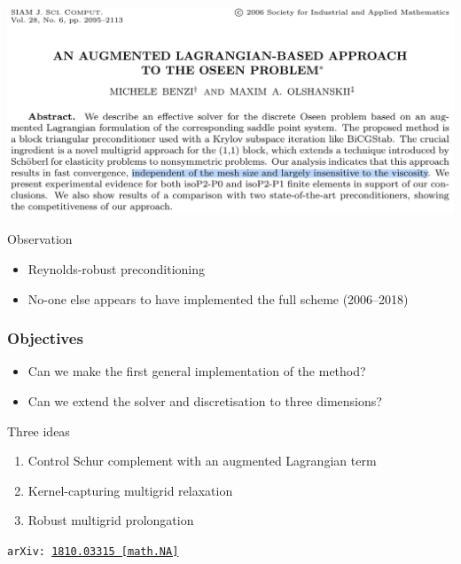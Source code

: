 \documentclass[presentation,aspectratio=43, 10pt]{beamer}
\newcommand{\cmark}{\ding{51}}
\newcommand{\xmark}{\ding{55}}
\newcommand{\arxivlink}[2]{{\texttt{arXiv:\,\href{https://arxiv.org/abs/#1}{#1\,[#2]}}}}
\begin{document}
\begin{frame}
  \begin{center}
    \includegraphics[width=\textwidth]{benzi06}
  \end{center}
  \pause
    \begin{block}{Observation}
    \begin{itemize}
    \item[\cmark] Reynolds-robust preconditioning
    \item[\xmark] No-one else appears to have implemented the full scheme
      (2006--2018)
    \end{itemize}
  \end{block}
\end{frame}

\begin{frame}[t]
  \frametitle{Objectives}
  \begin{itemize}
  \item Can we make the first general implementation of the method? \cmark
  \item Can we extend the solver and discretisation to three
    dimensions? \cmark
  \end{itemize}
  \pause
  \begin{block}{Three ideas}
    \begin{enumerate}
    \item Control Schur complement with an augmented Lagrangian term
    \item Kernel-capturing multigrid relaxation
    \item Robust multigrid prolongation
    \end{enumerate}
  \end{block}
  {\hfill\raggedleft\scriptsize \textcite{Farrell:2018} \arxivlink{1810.03315}{math.NA}}
\end{frame}
\end{document}
